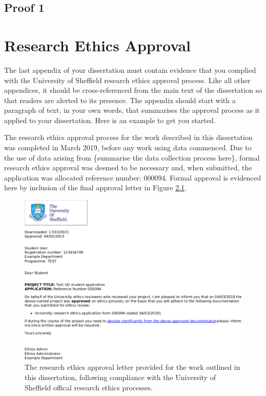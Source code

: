 \documentclass[
  12pt,
  a4paper,
  twoside]{book}
\begin{document}
\hypertarget{proof-1}{%
\section{Proof 1}\label{proof-1}}

\hypertarget{research-ethics-approval}{%
\chapter{Research Ethics Approval}\label{research-ethics-approval}}

The last appendix of your dissertation must contain evidence that you complied with the University of Sheffield research ethics approval process. Like all other appendices, it should be cross-referenced from the main text of the dissertation so that readers are alerted to its presence. The appendix should start with a paragraph of text, in your own words, that summarises the approval process as it applied to your dissertation. Here is an example to get you started.

The research ethics approval process for the work described in this dissertation was completed in March 2019, before any work using data commenced. Due to the use of data arising from \{summarise the data collection process here\}, formal research ethics approval was deemed to be necessary and, when submitted, the application was allocated reference number: 000094. Formal approval is evidenced here by inclusion of the final approval letter in Figure \ref{fig:ethicsapprov}.

\newpage

\begin{figure}[H]

{\centering \includegraphics[width=1\linewidth]{figures/ApprovalLetterCrop} 

}

\caption{The research ethics approval letter provided for the work outlined in this dissertation, following compliance with the University of Sheffield offical research ethics processes.}\label{fig:ethicsapprov}
\end{figure}
\end{document}
